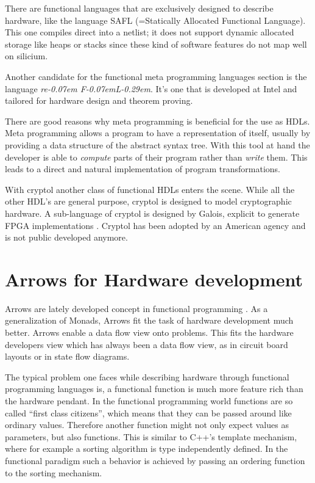 \documentclass{llncs}
\newcommand{\reFLect}{\textit{re\kern-0.07em F\kern-0.07emL\kern-0.29em\raisebox{0.56ex}{ect}}}
\begin{document}
\par
There are functional languages that are exclusively designed to describe hardware, like the language SAFL (=Statically Allocated
Functional Language)\cite{sharp,sharp:flash,sharp:codesign}. This one compiles direct into a netlist; it does not support dynamic
allocated storage like heaps or stacks since these kind of software features do not map well on silicium.

\par
Another candidate for the functional meta programming languages section is the language \reFLect \cite{reflect}. It's one that is
developed at Intel and tailored for hardware design and theorem proving.

\par
There are good reasons why meta programming is beneficial for the use as HDLs. Meta programming allows a program to have a
representation of itself, usually by providing a data structure of the abstract syntax tree. With this tool at hand the developer
is able to \emph{compute} parts of their program rather than \emph{write} them. This leads to a direct and natural implementation
of program transformations.

\par
With cryptol\cite{cryptol:programming} another class of functional HDLs enters the scene. While all the other HDL's are general
purpose, cryptol is designed to model cryptographic hardware. A sub-language of cryptol is designed by Galois, explicit to
generate FPGA implementations \cite{cryptol:fpga}. Cryptol has been adopted by an American agency and is not public developed
anymore.


\section{Arrows for Hardware development}
Arrows are lately developed concept in functional programming \cite{Hughes98generalisingmonads}. As a generalization of Monads,
Arrows fit the task of hardware development much better. Arrows enable a data flow view onto problems. This fits the hardware
developers view which has always been a data flow view, as in circuit board layouts or in state flow diagrams.

\par
The typical problem one faces while describing hardware through functional programming languages is, a functional function is much
more feature rich than the hardware pendant. In the functional programming world functions are so called ``first class citizens'',
which means that they can be passed around like ordinary values. Therefore another function might not only expect values as
parameters, but also functions. This is similar to C++'s template mechanism, where for example a sorting algorithm is type
independently defined. In the functional paradigm such a behavior is achieved by passing an ordering function to the sorting
mechanism. 
\end{document}
